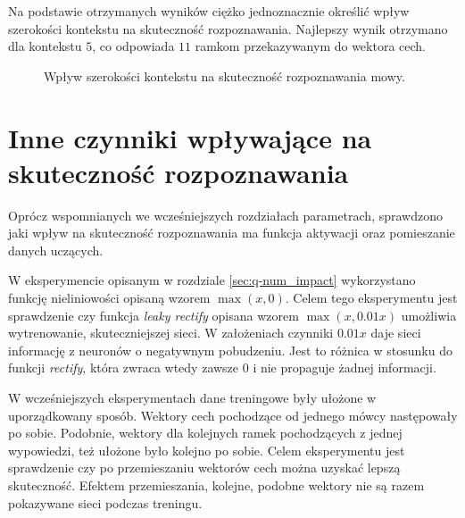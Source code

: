 \documentclass[shortabstract, mgr]{iithesis}
\begin{document}
		Na podstawie otrzymanych wyników ciężko jednoznacznie określić wpływ szerokości kontekstu na skuteczność rozpoznawania. Najlepszy wynik otrzymano dla kontekstu $5$, co odpowiada $11$ ramkom przekazywanym do wektora cech.
		
		\begin{figure}[H]
			\centering
			\label{fig:fig_ctx_impact}
			\caption{Wpływ szerokości kontekstu na skuteczność rozpoznawania mowy.}
		\end{figure}

	\section{ Inne czynniki wpływające na skuteczność rozpoznawania }
		Oprócz wspomnianych we wcześniejszych rozdziałach parametrach, sprawdzono jaki wpływ na skuteczność rozpoznawania ma funkcja aktywacji oraz pomieszanie danych uczących. 
		
		W eksperymencie opisanym w rozdziale \ref{sec:q-num_impact} wykorzystano funkcję nieliniowości opisaną wzorem $\max(x,0)$. Celem tego eksperymentu jest sprawdzenie czy funkcja \textit{leaky rectify} opisana wzorem $\max(x, 0.01x)$ umożliwia wytrenowanie, skuteczniejszej sieci. W założeniach czynniki $0.01x$ daje sieci informację z neuronów o negatywnym pobudzeniu. Jest to różnica w stosunku do funkcji \textit{rectify}, która zwraca wtedy zawsze $0$ i nie propaguje żadnej informacji. 
		
		W wcześniejszych eksperymentach dane treningowe były ułożone w uporządkowany sposób. Wektory cech pochodzące od jednego mówcy następowały po sobie. Podobnie, wektory dla kolejnych ramek pochodzących z jednej wypowiedzi, też  ułożone było kolejno po sobie. Celem eksperymentu jest sprawdzenie czy po przemieszaniu wektorów cech można uzyskać lepszą skuteczność. Efektem przemieszania, kolejne, podobne wektory nie są razem pokazywane sieci podczas treningu.
		
\end{document}
